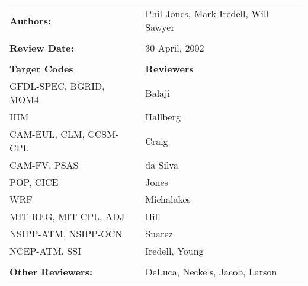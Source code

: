 
\begin{tabular}{l l}

{\bf Authors:} & Phil Jones, Mark Iredell, Will Sawyer \\ \\

{\bf Review Date:}            & 30 April, 2002 \\ \\

{\bf Target Codes}            & {\bf Reviewers} \\
GFDL-SPEC, BGRID, MOM4        & Balaji \\
HIM                           & Hallberg \\
CAM-EUL, CLM, CCSM-CPL        & Craig \\
CAM-FV, PSAS                  & da Silva\\
POP, CICE                     & Jones \\
WRF                           & Michalakes \\
MIT-REG, MIT-CPL, ADJ         & Hill \\
NSIPP-ATM, NSIPP-OCN          & Suarez \\
NCEP-ATM, SSI                 & Iredell, Young \\ \\

{\bf Other Reviewers:}        & DeLuca, Neckels, Jacob, Larson

\end{tabular}

